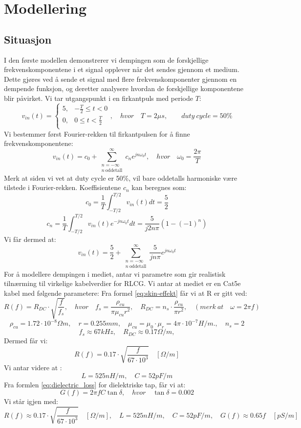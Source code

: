 \section{Modellering}
\subsection{Situasjon}
I den første modellen demonstrerer vi dempingen som de forskjellige frekvenskomponentene i et signal opplever når det sendes gjennom et medium. Dette gjøres ved å sende et signal med flere frekvenskomponenter gjennom en dempende funksjon, og deretter analysere hvordan de forskjellige komponentene blir påvirket.
Vi tar utgangspunkt i en firkantpuls med periode $T$:
\[
    v_{in}(t) = \begin{cases}
        5, & -\frac{T}{2} \leq t < 0 \\
        0, & 0 \leq t < \frac{T}{2} \\
    \end{cases}, \quad hvor \quad T = 2 \mu s,\qquad duty\ cycle = 50\%
\]
Vi bestemmer først Fourier-rekken til firkantpulsen for å finne frekvenskomponentene:
\[
    v_{in}(t) = c_0 + \sum_{\substack{n=-\infty\\ n\ \text{oddetall}}}^{\infty} c_n e^{j n \omega_0 t}, \quad hvor \quad \omega_0 = \frac{2\pi}{T}
\]
Merk at siden vi vet at duty cycle er 50\%, vil bare oddetalls harmoniske være tilstede i Fourier-rekken.
Koeffisientene $c_n$ kan beregnes som:
\[
    c_0 = \frac{1}{T} \int_{-T/2}^{T/2} v_{in}(t) dt = \frac{5}{2}
\]
\[
    c_n = \frac{1}{T} \int_{-T/2}^{T/2} v_{in}(t) e^{-j n \omega_0 t} dt =  \frac{5}{j 2 n \pi} (1 - (-1)^n)
\]
Vi får dermed at:
\[
    v_{in}(t) = \frac{5}{2} + \sum_{\substack{n=-\infty\\ n\ \text{oddetall}}}^{\infty} \frac{5}{j n \pi} e^{j n \omega_0 t}
\]
For å modellere dempingen i mediet, antar vi parametre som gir realistisk tilnærming til virkelige kabelverdier for RLCG.
Vi antar at mediet er en Cat5e kabel med følgende parametere:
Fra formel \eqref{eq:skin-effekt} får vi at R er gitt ved:
\[
    R(f) = R_{DC} \cdot \sqrt{\frac{f}{f_{s}}}, \quad hvor \quad f_{s} = \frac{\rho_{cu}}{\pi \mu_{cu} r^2}, \quad R_{DC} = n_s \cdot \frac{\rho_{cu}}{\pi r^2}, \quad (merk\ at \quad \omega = 2\pi f)
\]
\[
    \rho_{cu} = 1.72 \cdot 10^{-8} \Omega m, \quad r = 0.255 mm, \quad \mu_{cu} = \mu_0 \cdot \mu_r = 4\pi \cdot 10^{-7} H/m., \quad n_s = 2
\]
\[
    f_s \approx 67kHz, \quad R_{DC} \approx 0.17 \Omega/m,
\]
Dermed får vi:
\[
    R(f) = 0.17 \cdot \sqrt{\frac{f}{67 \cdot 10^3}} \quad [\Omega/m]
\]
Vi antar videre at \cite{Cat5e_Characteristics}:
\[
    L = 525 nH/m, \quad C = 52 pF/m
\]
Fra formlen \eqref{eq:dielectric_loss} for dielektriske tap, får vi at:
\[
    G(f) = 2\pi f C \tan \delta, \quad hvor \quad \tan \delta = 0.002
\]
\clearpage
\noindent Vi står igjen med:
\[
    R(f) \approx 0.17 \cdot \sqrt{\frac{f}{67 \cdot 10^3}} \quad [\Omega/m], \quad L = 525 nH/m, \quad C = 52 pF/m, \quad G(f) \approx 0.65f \quad [pS/m]
\]

